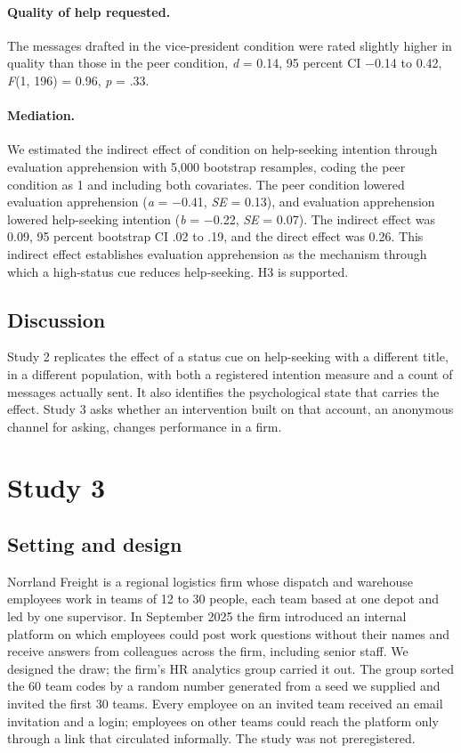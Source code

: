 \documentclass[11pt]{article}
\begin{document}
\paragraph{Quality of help requested.} The messages drafted in the vice-president condition were rated slightly higher in quality than those in the peer condition, \textit{d} = 0.14, 95 percent CI $-$0.14 to 0.42, {\itshape F}(1, 196) = 0.96, \textit{p} = .33.

\paragraph{Mediation.} We estimated the indirect effect of condition on help-seeking intention through evaluation apprehension with 5,000 bootstrap resamples, coding the peer condition as 1 and including both covariates. The peer condition lowered evaluation apprehension (\textit{a} = $-$0.41, \textit{SE} = 0.13), and evaluation apprehension lowered help-seeking intention (\textit{b} = $-$0.22, \textit{SE} = 0.07). The indirect effect was 0.09, 95 percent bootstrap CI .02 to .19, and the direct effect was 0.26. This indirect effect establishes evaluation apprehension as the mechanism through which a high-status cue reduces help-seeking. H3 is supported.

\subsection{Discussion}

Study 2 replicates the effect of a status cue on help-seeking with a different title, in a different population, with both a registered intention measure and a count of messages actually sent. It also identifies the psychological state that carries the effect. Study 3 asks whether an intervention built on that account, an anonymous channel for asking, changes performance in a firm.

\section{Study 3}

\subsection{Setting and design}

Norrland Freight is a regional logistics firm whose dispatch and warehouse employees work in teams of 12 to 30 people, each team based at one depot and led by one supervisor. In September 2025 the firm introduced an internal platform on which employees could post work questions without their names and receive answers from colleagues across the firm, including senior staff. We designed the draw; the firm's HR analytics group carried it out. The group sorted the 60 team codes by a random number generated from a seed we supplied and invited the first 30 teams. Every employee on an invited team received an email invitation and a login; employees on other teams could reach the platform only through a link that circulated informally. The study was not preregistered.
\end{document}
